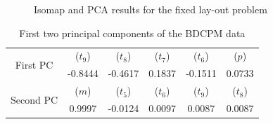 
\begin{figure}[ht]\begin{center}
 \caption{Isomap and PCA results for the fixed lay-out problem}
 \label{gt11Var}
\end{center}\end{figure}

\begin{table}[!ht]
  \centering
  \begin{tabular}{|c|c|c|c|c|c|}
    \hline
    \multirow{2}{*}{First PC}   & ($t_9$) &  ($t_8$) &  ($t_7$)  & ($t_6$) & ($p$)\\
    & -0.8444  & -0.4617  & 0.1837 & -0.1511 & 0.0733  \\
    \hline
    \multirow{2}{*}{Second PC}   & ($m$) &  ($t_5$) &  ($t_6$)  & ($t_9$) & ($t_8$)\\
    & 0.9997 & -0.0124 & 0.0097 & 0.0087 &  0.0087 \\
    \hline
  \end{tabular}
  \caption{First two principal components of the BDCPM data}
  \label{first2GTPCs}
\end{table}

